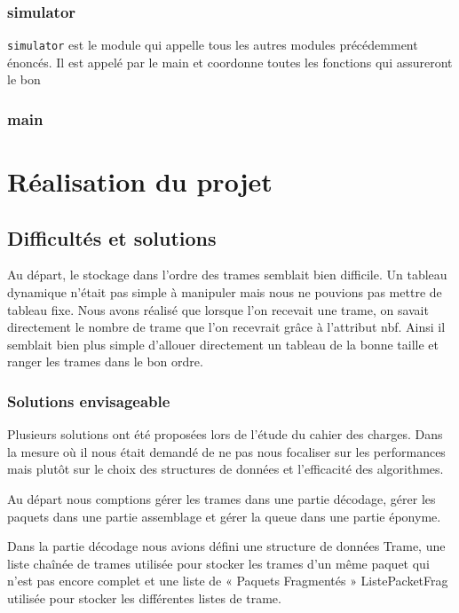 \documentclass[a4paper,11pt]{article}
\begin{document}
\subsubsection{simulator}
\texttt{simulator} est le module qui appelle tous les autres modules précédemment énoncés. Il est appelé par le main et coordonne toutes les fonctions qui assureront le bon  
\subsubsection{main}

\section{Réalisation du projet}

\subsection{Difficultés et solutions}

Au départ, le stockage dans l'ordre des trames semblait bien difficile. Un tableau dynamique n'était pas simple à manipuler mais nous ne pouvions pas mettre de tableau fixe. Nous avons réalisé que lorsque l'on recevait une trame, on savait directement le nombre de trame que l'on recevrait grâce à l’attribut nbf. Ainsi il semblait bien plus simple d'allouer directement un tableau de la bonne taille et ranger les trames dans le bon ordre.

\subsubsection{Solutions envisageable}

Plusieurs solutions ont été proposées lors de l'étude du cahier des charges. Dans la mesure où il nous était demandé de ne pas nous focaliser sur les performances mais plutôt sur le choix des structures de données et l'efficacité des algorithmes.

Au départ nous comptions gérer les trames dans une partie décodage, gérer les paquets dans une partie assemblage et gérer la queue dans une partie éponyme.
 
Dans la partie décodage nous avions défini une structure de données Trame, une liste chaînée de trames utilisée pour stocker les trames d'un même paquet qui n'est pas encore complet et une liste de « Paquets Fragmentés » ListePacketFrag utilisée pour stocker les différentes listes de trame.
\end{document}
